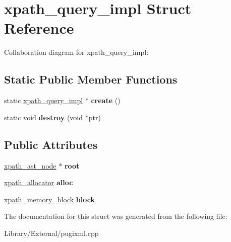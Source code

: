 \hypertarget{structxpath__query__impl}{}\section{xpath\+\_\+query\+\_\+impl Struct Reference}
\label{structxpath__query__impl}


Collaboration diagram for xpath\+\_\+query\+\_\+impl\+:
\subsection*{Static Public Member Functions}
\begin{DoxyCompactItemize}
\item 
\hypertarget{structxpath__query__impl_afcf45bb9a20a4117b1e963d83277aa7f}{}static \hyperlink{structxpath__query__impl}{xpath\+\_\+query\+\_\+impl} $\ast$ {\bfseries create} ()\label{structxpath__query__impl_afcf45bb9a20a4117b1e963d83277aa7f}

\item 
\hypertarget{structxpath__query__impl_a9b7194b1356cca3f3b62f4cdb8d8960f}{}static void {\bfseries destroy} (void $\ast$ptr)\label{structxpath__query__impl_a9b7194b1356cca3f3b62f4cdb8d8960f}

\end{DoxyCompactItemize}
\subsection*{Public Attributes}
\begin{DoxyCompactItemize}
\item 
\hypertarget{structxpath__query__impl_ad25499e0c8391005e3a1a60633d631fe}{}\hyperlink{classxpath__ast__node}{xpath\+\_\+ast\+\_\+node} $\ast$ {\bfseries root}\label{structxpath__query__impl_ad25499e0c8391005e3a1a60633d631fe}

\item 
\hypertarget{structxpath__query__impl_ae568b8642d48e729f2ccc2a50467c847}{}\hyperlink{classxpath__allocator}{xpath\+\_\+allocator} {\bfseries alloc}\label{structxpath__query__impl_ae568b8642d48e729f2ccc2a50467c847}

\item 
\hypertarget{structxpath__query__impl_a3a8af3ceed6a504567656ec6d1b62641}{}\hyperlink{structxpath__memory__block}{xpath\+\_\+memory\+\_\+block} {\bfseries block}\label{structxpath__query__impl_a3a8af3ceed6a504567656ec6d1b62641}

\end{DoxyCompactItemize}


The documentation for this struct was generated from the following file\+:\begin{DoxyCompactItemize}
\item 
Library/\+External/pugixml.\+cpp\end{DoxyCompactItemize}
